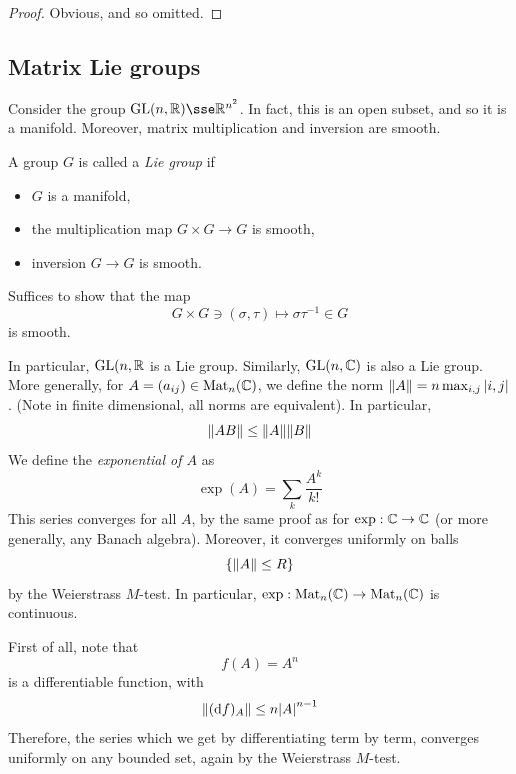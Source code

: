 \documentclass{article}
\begin{document}
\begin{proof}
    Obvious, and so omitted.
\end{proof}

\subsection{Matrix Lie groups}

Consider the group \(\GL(n, \R) \sse \R^{n^2}\). In fact, this is an open subset, and so it is a manifold. Moreover, matrix multiplication and inversion are smooth.

\begin{definition}
     A group \(G\) is called a \emph{Lie group} if
    \begin{itemize}
        \item \(G\) is a manifold,
        \item the multiplication map \(G \times G \to G\) is smooth,
        \item inversion \(G \to G\) is smooth.
    \end{itemize}
\end{definition}

\begin{remark}
    Suffices to show that the map
    \[G \times G \ni (\sigma, \tau) \mapsto \sigma\tau^{-1} \in G\]
    is smooth.
\end{remark}

In particular, \(\operatorname{GL}(n, \mathbb{R}\) is a Lie group. Similarly, \(\operatorname{GL}(n, \mathbb{C})\) is also a Lie group. More generally, for \(A = (a_{ij}) \in \operatorname{Mat}_n(\mathbb{C})\), we define the norm \(\norm{A} = n\max_{i, j}\abs{i, j}\). (Note in finite dimensional, all norms are equivalent). In particular,
\[\norm{AB} \le \norm{A}\norm{B}\]
We define the \emph{exponential of \(A\)} as
\[\exp(A) = \sum_k \frac{A^k}{k!}\]
This series converges for all \(A\), by the same proof as for \(\exp : \mathbb{C} \to \mathbb{C}\) (or more generally, any Banach algebra). Moreover, it converges uniformly on balls
\[\left\{\norm{A} \le R\right\}\]
by the Weierstrass \(M\)-test. In particular, \(\exp : \operatorname{Mat}_n(\mathbb{C}) \to \operatorname{Mat}_n(\mathbb{C})\) is continuous.

\lec

First of all, note that
\[f(A) = A^n\]
is a differentiable function, with
\[\norm{(\dd f)_A} \le n\abs{A}^{n-1}\]
Therefore, the series which we get by differentiating term by term, converges uniformly on any bounded set, again by the Weierstrass \(M\)-test.
\end{document}
